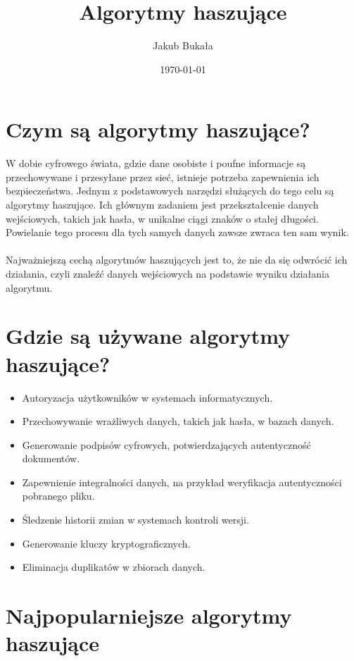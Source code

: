 \documentclass{article}
\title{Algorytmy haszujące}
\author{Jakub Bukała}
\date{\today}
\begin{document}
    \maketitle

    \section{Czym są algorytmy haszujące?}
    \label{section:what-are-hash-algorithms}
        W dobie cyfrowego świata, gdzie dane osobiste i poufne informacje są przechowywane i przesyłane przez sieć, istnieje potrzeba zapewnienia ich bezpieczeństwa.
        Jednym z podstawowych narzędzi służących do tego celu są algorytmy haszujące.
        Ich głównym zadaniem jest przekształcenie danych wejściowych, takich jak hasła, w unikalne ciągi znaków o stałej długości.
        Powielanie tego procesu dla tych samych danych zawsze zwraca ten sam wynik.
        \\
        \\
        Najważniejszą cechą algorytmów haszujących jest to, że nie da się odwrócić ich działania, czyli znaleźć danych wejściowych na podstawie wyniku działania algorytmu.

    \section{Gdzie są używane algorytmy haszujące?}
    \label{section:where-are-hash-algorithms-used}

    \begin{itemize}
        \item Autoryzacja użytkowników w systemach informatycznych.
        \item Przechowywanie wrażliwych danych, takich jak hasła, w bazach danych.
        \item Generowanie podpisów cyfrowych, potwierdzających autentyczność dokumentów.
        \item Zapewnienie integralności danych, na przykład weryfikacja autentyczności pobranego pliku.
        \item Śledzenie historii zmian w systemach kontroli wersji.
        \item Generowanie kluczy kryptograficznych.
        \item Eliminacja duplikatów w zbiorach danych.
    \end{itemize}

    \clearpage

    \section{Najpopularniejsze algorytmy haszujące}
    \label{section:most-popular-hash-algorithms}
\end{document}
